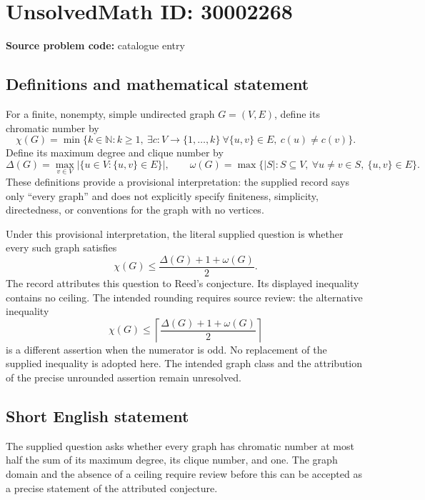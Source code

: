\documentclass[11pt]{article}
\newcommand{\N}{\mathbb{N}}
\begin{document}
\section*{UnsolvedMath ID: 30002268}
\textbf{Source problem code:} catalogue entry
\subsection{Definitions and mathematical statement}
For a finite, nonempty, simple undirected graph \(G=(V,E)\), define its chromatic number by
\[
\chi(G)=\min\bigl\{k\in\N:k\geq 1,\ \exists c:V\to\{1,\ldots,k\}\ \forall\{u,v\}\in E,\ c(u)\neq c(v)\bigr\}.
\]
Define its maximum degree and clique number by
\[
\Delta(G)=\max_{v\in V}|\{u\in V:\{u,v\}\in E\}|,
\qquad
\omega(G)=\max\bigl\{|S|:S\subseteq V,\ \forall u\neq v\in S,\ \{u,v\}\in E\bigr\}.
\]
These definitions provide a provisional interpretation: the supplied record says only ``every graph'' and does not explicitly specify finiteness, simplicity, directedness, or conventions for the graph with no vertices.

Under this provisional interpretation, the literal supplied question is whether every such graph satisfies
\[
\chi(G)\leq\frac{\Delta(G)+1+\omega(G)}{2}.
\]
The record attributes this question to Reed's conjecture. Its displayed inequality contains no ceiling. The intended rounding requires source review: the alternative inequality
\[
\chi(G)\leq\left\lceil\frac{\Delta(G)+1+\omega(G)}{2}\right\rceil
\]
is a different assertion when the numerator is odd. No replacement of the supplied inequality is adopted here. The intended graph class and the attribution of the precise unrounded assertion remain unresolved.
\subsection{Short English statement}
The supplied question asks whether every graph has chromatic number at most half the sum of its maximum degree, its clique number, and one. The graph domain and the absence of a ceiling require review before this can be accepted as a precise statement of the attributed conjecture.
\end{document}
